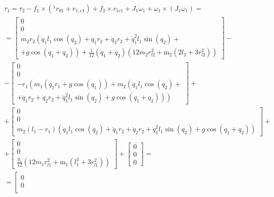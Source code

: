\documentclass[a4paper,14pt]{extreport}
\begin{document}
\begin{eqnarray}
\tau_1 = \tau_2 - f_1 \times (^1 r_{01} + r_{1,c1}) + f_2 \times r_{1c1} + J_1 \dot \omega_1 + \omega_1 \times (J_1 \omega_1) =\nonumber\\
=
\left[\begin{matrix}0\\0\\m_{2} r_{2} \left(\ddot{q}_1 l_{1} \cos{\left (q_{2} \right )} + \ddot{q}_1 r_{2} + \ddot{q}_2 r_{2} + \dot{q}_1^{2} l_{1} \sin{\left (q_{2} \right )} \right.+\\+\left. g \cos{\left (q_{1} + q_{2} \right )}\right) + \frac{1}{12} \left(\ddot{q}_1 + \ddot{q}_2\right) \left(12 m_{2} r_{l2}^{2} + \operatorname{m_{2}}{\left (2 l_{2} + 3 r_{l2}^{2} \right )}\right)\end{matrix}\right]
-\nonumber\\
-
\left[\begin{matrix}0\\0\\
- r_{1} \left(m_{1} \left(\ddot{q}_1 r_{1} + g \cos{\left (q_{1} \right )}\right) + m_{2} \left(\ddot{q}_1 l_{1} \cos{\left (q_{2} \right )} \right.\right. +\\+\left.\left. \ddot{q}_1 r_{2} + \ddot{q}_2 r_{2} + \dot{q}_1^{2} l_{1} \sin{\left (q_{2} \right )} + g \cos{\left (q_{1} + q_{2} \right )}\right)\right)\end{matrix}\right]
+\nonumber\\
+
\left[\begin{matrix}0\\0\\m_{2} \left(l_{1} - r_{1}\right) \left(\ddot{q}_1 l_{1} \cos{\left (q_{2} \right )} + \ddot{q}_1 r_{2} + \ddot{q}_2 r_{2} + \dot{q}_1^{2} l_{1} \sin{\left (q_{2} \right )} + g \cos{\left (q_{1} + q_{2} \right )}\right)\end{matrix}\right]
+\nonumber\\
+
\left[\begin{matrix}0\\0\\\frac{\ddot{q}_1}{12} \left(12 m_{1} r_{l1}^{2} + \operatorname{m_{1}}{\left (l_{1}^{2} + 3 r_{l1}^{2} \right )}\right)\end{matrix}\right]
+
\left[\begin{matrix}0\\0\\0\end{matrix}\right]
=\nonumber\\
=
\left[\begin{matrix}0\\0\\

\end{matrix}
\end{eqnarray}
\end{document}
